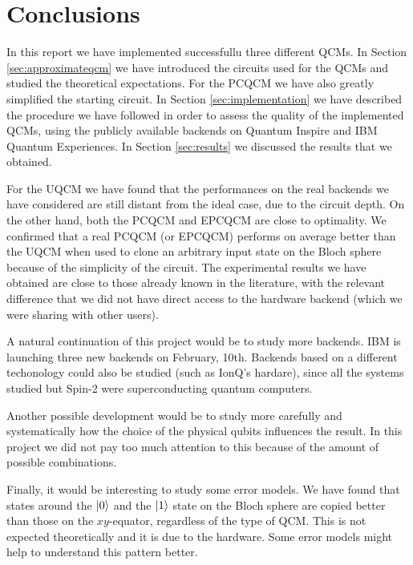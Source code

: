 \chapter{Conclusions}
\label{sec:conclusions}

In this report we have implemented successfullu three different QCMs.
In Section \ref{sec:approximateqcm} we have introduced the circuits used for the QCMs and studied the theoretical expectations.
For the PCQCM we have also greatly simplified the starting circuit.
In Section \ref{sec:implementation} we have described the procedure we have followed in order to assess the quality of the implemented QCMs, using the publicly available backends on Quantum Inspire and IBM Quantum Experiences.
In Section \ref{sec:results} we discussed the results that we obtained.

For the UQCM we have found that the performances on the real backends we have considered are still distant from the ideal case, due to the circuit depth.
On the other hand, both the PCQCM and EPCQCM are close to optimality. 
We confirmed that a real PCQCM (or EPCQCM) performs on average better than the UQCM when used to clone an arbitrary input state on the Bloch sphere because of the simplicity of the circuit.
The experimental results we have obtained are close to those already known in the literature, with the relevant difference that we did not have direct access to the hardware backend (which we were sharing with other users). 

A natural continuation of this project would be to study more backends. 
IBM is launching three new backends on February, 10th.
Backends based on a different techonology could also be studied (such as IonQ's hardare), since all the systems studied but Spin-2 were superconducting quantum computers.

Another possible development would be to study more carefully and systematically how the choice of the physical qubits influences the result.
In this project we did not pay too much attention to this because of the amount of possible combinations.

Finally, it would be interesting to study some error models. 
We have found that states around the $\ket{0}$ and the $\ket{1}$ state on the Bloch sphere are copied better than those on the $xy$-equator, regardless of the type of QCM.
This is not expected theoretically and it is due to the hardware. Some error models might help to understand this pattern better.

